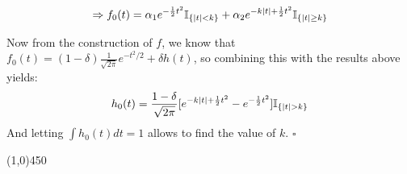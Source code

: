 \documentclass[12pt]{article}
\begin{document}
$$\Rightarrow f_0(t) = \alpha_1 e^{-\frac{1}{2}t^2} \mathbb{I}_{\{|t| < k\}} + \alpha_2 e^{-k|t|+\frac{1}{2}t^2} \mathbb{I}_{\{|t|\geq k\}}$$

\noindent
Now from the construction of $f$, we know that $f_0(t) = (1-\delta)\frac{1}{\sqrt{2\pi}} e^{-t^2/2}+\delta h(t)$, so combining this with the results above yields:
$$h_0(t) = \frac{1-\delta}{\sqrt{2\pi}} [e^{-k|t|+\frac{1}{2}t^2}-e^{-\frac{1}{2}t^2}] \mathbb{I}_{\{|t| > k\}}$$
And letting $\int h_0(t) dt = 1$ allows to find the value of $k$. $\square$


\begin{center}
\line(1,0){450}
\end{center}
\end{document}

